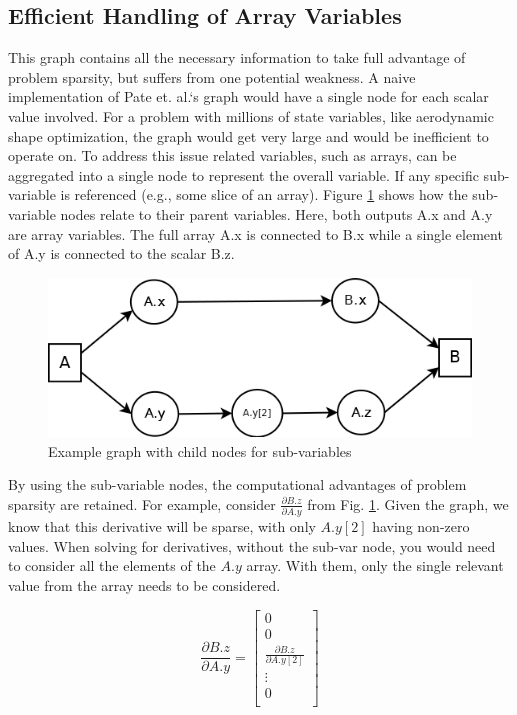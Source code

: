 \documentclass[]{aiaa-tc} %
\begin{document}
    \subsection{Efficient Handling of Array Variables}
        This graph contains all the necessary information to take full advantage of problem sparsity,
        but suffers from one potential weakness. A naive implementation of Pate et. al.`s graph would have a
        single node for each scalar value involved. For a problem with millions of state variables, like
        aerodynamic shape optimization, the graph would get very large and would be inefficient to operate on.
        To address this issue related variables, such as arrays, can be aggregated into a single node to
        represent the overall variable. If any specific sub-variable is referenced
        (e.g., some slice of an array). Figure \ref{fig:subvars} shows how the sub-variable nodes relate to their parent variables. Here,
        both outputs A.x and A.y are array variables. The full array A.x is connected to B.x while a single element
        of A.y is connected to the scalar B.z.

        \begin{figure}[!htb]\begin{center}
          \includegraphics[width=.8\textwidth]{images/Graph1}
          \caption{ Example graph with child nodes for sub-variables \label{fig:subvars}}
        \end{center}\end{figure}

        By using the sub-variable nodes, the computational advantages of problem sparsity are retained. For example,
        consider $\frac{\partial B.z}{\partial A.y}$ from Fig. \ref{fig:subvars}. Given the graph, we know that
        this derivative will be sparse, with only $A.y[2]$ having non-zero values. When solving for derivatives,
        without the sub-var node, you would need to consider all the elements of the $A.y$ array. With them, only
        the single relevant value from the array needs to be considered.

        \begin{equation}
            \frac{\partial B.z}{\partial A.y} =
            \begin{bmatrix}
                0 \\
                0 \\
                \frac{\partial B.z}{\partial A.y[2]} \\
                \vdots \\
                0 \\
            \end{bmatrix}
        \end{equation}
\end{document}
